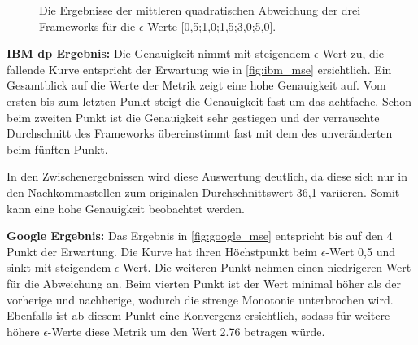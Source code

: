 \begin{figure}[htbp]
{	}
	\caption{Die Ergebnisse der mittleren quadratischen Abweichung der drei Frameworks für die $\epsilon$-Werte [0,5;1,0;1,5;3,0;5,0].}
	\label{fig:mse}
\end{figure}

\textbf{IBM \gls{dp} Ergebnis:}
Die Genauigkeit nimmt mit steigendem $\epsilon$-Wert zu, die fallende Kurve entspricht der Erwartung wie in \cref{fig:ibm_mse} ersichtlich. Ein Gesamtblick auf die Werte der Metrik zeigt eine hohe Genauigkeit auf. Vom ersten bis zum letzten Punkt steigt die Genauigkeit fast um das achtfache. Schon beim zweiten Punkt ist die Genauigkeit sehr gestiegen und der verrauschte Durchschnitt des Frameworks übereinstimmt fast mit dem des unveränderten beim fünften Punkt.

In den Zwischenergebnissen wird diese Auswertung deutlich, da diese sich nur in den Nachkommastellen zum originalen Durchschnittswert 36,1 variieren. Somit kann eine hohe Genauigkeit beobachtet werden.

\textbf{Google Ergebnis:}
Das Ergebnis in \cref{fig:google_mse} entspricht bis auf den 4 Punkt der Erwartung. Die Kurve hat ihren Höchstpunkt beim $\epsilon$-Wert 0,5 und sinkt mit steigendem $\epsilon$-Wert. Die weiteren Punkt nehmen einen niedrigeren Wert für die Abweichung an. Beim vierten Punkt ist der Wert minimal höher als der vorherige und nachherige, wodurch die strenge Monotonie unterbrochen wird. Ebenfalls ist ab diesem Punkt eine Konvergenz ersichtlich, sodass für weitere höhere $\epsilon$-Werte diese Metrik um den Wert 2.76 betragen würde.

